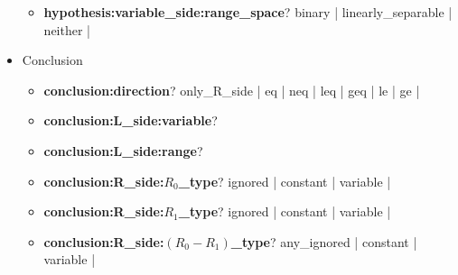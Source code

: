 \documentclass[onecolumn]{ctexart}
\begin{document}
\begin{itemize}
\begin{itemize}

        \item  \textbf{hypothesis:variable\_side:range\_space}? \qquad
            {\color{LimeGreen} binary}  |
            {\color{red}   linearly\_separable}  |
            {\color{red}   neither}  |

    \end{itemize}

    \item  Conclusion  %
    \begin{itemize}

        \item  \textbf{conclusion:direction}? \qquad
            {\color{LimeGreen} only\_R\_side}  |
            {\color{blue}      eq}   |
            {\color{blue}      neq}  |
            {\color{blue}      leq}  |
            {\color{blue}      geq}  |
            {\color{blue}      le}   |
            {\color{blue}      ge}   |

        \item  \textbf{\color{gray} conclusion:L\_side:variable}? \qquad

        \item  \textbf{\color{gray} conclusion:L\_side:range}? \qquad


        \item  \textbf{conclusion:R\_side:$R_0$\_type}? \qquad \qquad \qquad \quad
            {\color{red}       ignored}   |
            {\color{LimeGreen} constant}  |
            {\color{LimeGreen} variable}  |

        \item  \textbf{conclusion:R\_side:$R_1$\_type}? \qquad \qquad \qquad \quad
            {\color{red}       ignored}   |
            {\color{LimeGreen} constant}  |
            {\color{LimeGreen} variable}  |

        \item  \textbf{conclusion:R\_side:$(R_0 - R_1)$\_type}? \qquad
            {\color{red}       any\_ignored}   |
            {\color{LimeGreen} constant}  |
            {\color{red}       variable}  |


    \end{itemize}
\end{itemize}
\end{document}
